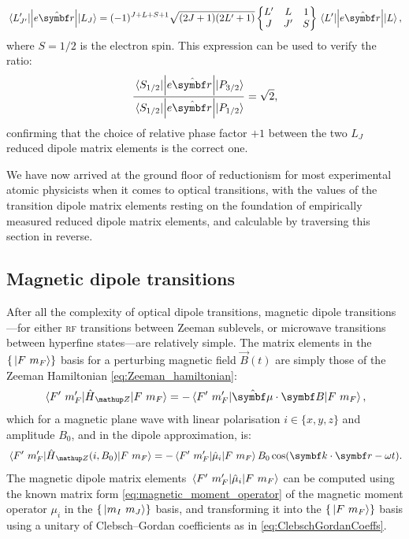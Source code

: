\begin{align}
\matrixel{L^\prime_{J^\prime}}{\left|e\hat{\vec r}\right|}{L_J} = 
(-1)^{J+L+S+1}\sqrt{(2J+1)(2L^\prime+1)}
\left\{\begin{matrix}
L^\prime & L & 1\\
J & J^\prime & S
\end{matrix}\right\}
\matrixel{L^\prime}{\left|e\hat{\vec r}\right|}{L},
\end{align}
where $S=1/2$ is the electron spin. This expression can be used to verify the ratio:
\begin{align}
\frac
{\matrixel{S_{1/2}}{\left|e\hat{\vec r}\right|}{P_{3/2}}}
{\matrixel{S_{1/2}}{\left|e\hat{\vec r}\right|}{P_{1/2}}} = \sqrt{2},
\end{align}
confirming that the choice of relative phase factor $+1$ between the two $L_J$ reduced dipole matrix elements is the correct one.

We have now arrived at the ground floor of reductionism for most experimental atomic physicists when it comes to optical transitions, with the values of the transition dipole matrix elements resting on the foundation of empirically measured reduced dipole matrix elements, and calculable by traversing this section in reverse.

\subsection{Magnetic dipole transitions}
After all the complexity of optical dipole transitions, magnetic dipole transitions---for either \textsc{rf} transitions between Zeeman sublevels, or microwave transitions between hyperfine states---are relatively simple. The matrix elements in the $\{\ket{F\ m_F}\}$ basis for a perturbing magnetic field $\vec B(t)$ are simply those of the Zeeman Hamiltonian \eqref{eq:Zeeman_hamiltonian}:
\begin{align}
\matrixel{F^\prime\ m_F^\prime}{\hat H_\up{Z}}{F\ m_F}
=
-\matrixel{F^\prime\ m_F^\prime}{\hat{\vec\mu}\cdot {\vec B}}{F\ m_F},
\end{align} 
which for a magnetic plane wave with linear polarisation $i\in \{x, y, z\}$ and amplitude $B_0$, and in the dipole approximation, is:
\begin{align}
\matrixel{F^\prime\ m_F^\prime}{\hat H_\up{Z}(i, B_0)}{F\ m_F}
=
-\matrixel{F^\prime\ m_F^\prime}{\hat{\mu}_i}{F\ m_F}B_0 \cos(\vec k\cdot \vec r - \omega t).
\end{align}
The magnetic dipole matrix elements $\matrixel{F^\prime\ m_F^\prime}{\hat{\mu}_i}{F\ m_F}$ can be computed using the known matrix form \eqref{eq:magnetic_moment_operator} of the magnetic moment operator $\mu_i$ in the $\{\ket{m_I\ m_J}\}$ basis, and transforming it into the $\{\ket{F\ m_F}\}$ basis using a unitary of Clebsch--Gordan coefficients as in \eqref{eq:ClebschGordanCoeffs}.

